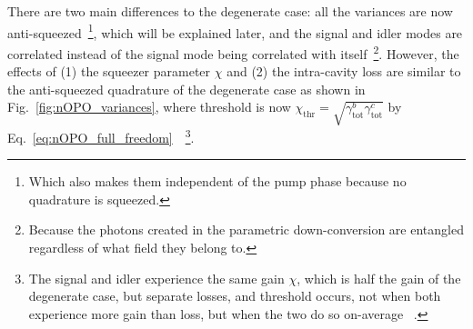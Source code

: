 There are two main differences to the degenerate case: all the variances are now anti-squeezed~\footnote{Which also makes them independent of the pump phase because no quadrature is squeezed.}, which will be explained later, and the signal and idler modes are correlated instead of the signal mode being correlated with itself~\footnote{Because the photons created in the parametric down-conversion are entangled regardless of what field they belong to.}.
However, the effects of (1) the squeezer parameter $\chi$ and (2) the intra-cavity loss are similar to the anti-squeezed quadrature of the degenerate case as shown in Fig.~\ref{fig:nOPO_variances}, where threshold is now $\chi_\text{thr}=\sqrt{\gamma^b_\text{tot}\gamma^c_\text{tot}}$ by Eq.~\ref{eq:nOPO_full_freedom}~\cite{}~\footnote{The signal and idler experience the same gain $\chi$, which is half the gain of the degenerate case, but separate losses, and threshold occurs, not when both experience more gain than loss, but when the two do so on-average~\cite{} .}. %

